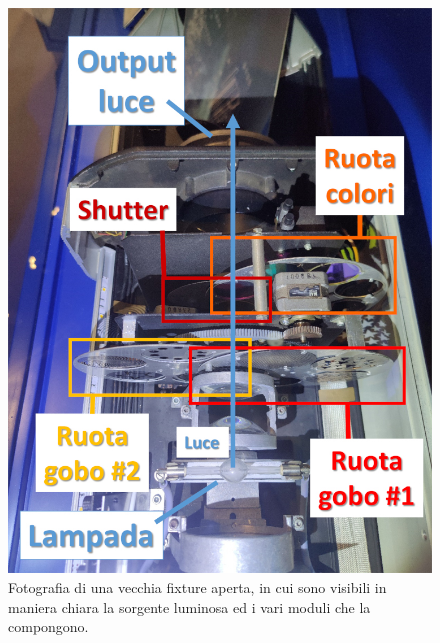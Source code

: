 \documentclass[main.tex]{subfiles}
\begin{document}
\begin{figure}[H]
    \centering
    \includegraphics[width=0.8\linewidth]{img/introduzione/fixtureModules.jpg}
    \caption{Fotografia di una vecchia fixture aperta, in cui sono visibili in maniera chiara la sorgente luminosa ed i vari moduli che la compongono.}
    \label{fig:1_FixtureModules}
\end{figure}
\end{document}
